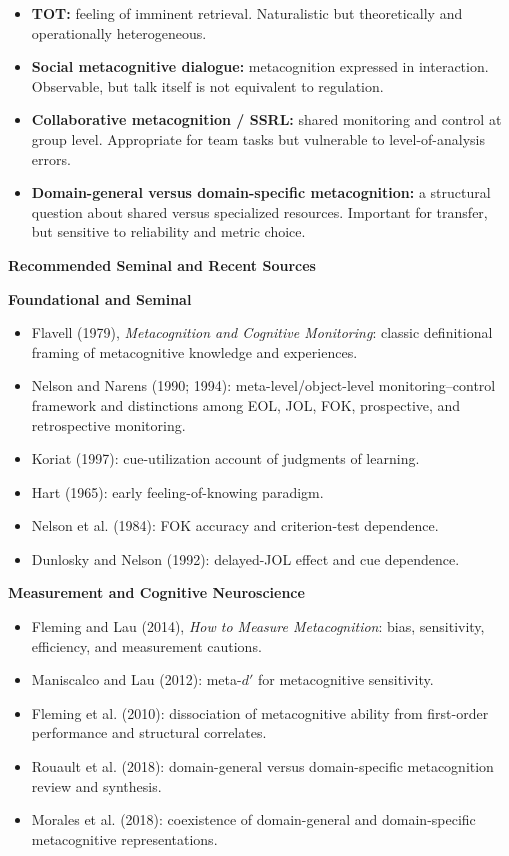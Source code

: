 \documentclass{book}
\providecommand{\ProjectDeepHeading}[2]{%
    \par\medskip\noindent\textbf{#2}\par\smallskip
}
\begin{document}
\begin{itemize}
      \item \textbf{TOT:} feeling of imminent retrieval. Naturalistic but theoretically and operationally heterogeneous.
      \item \textbf{Social metacognitive dialogue:} metacognition expressed in interaction. Observable, but talk itself is not equivalent to regulation.
      \item \textbf{Collaborative metacognition / SSRL:} shared monitoring and control at group level. Appropriate for team tasks but vulnerable to level-of-analysis errors.
      \item \textbf{Domain-general versus domain-specific metacognition:} a structural question about shared versus specialized resources. Important for transfer, but sensitive to reliability and metric choice.
   \end{itemize}

   \ProjectDeepHeading{5}{Recommended Seminal and Recent Sources}

   \ProjectDeepHeading{6}{Foundational and Seminal}

   \begin{itemize}
      \item Flavell (1979), \emph{Metacognition and Cognitive Monitoring}: classic definitional framing of metacognitive knowledge and experiences.
      \item Nelson and Narens (1990; 1994): meta-level/object-level monitoring--control framework and distinctions among EOL, JOL, FOK, prospective, and retrospective monitoring.
      \item Koriat (1997): cue-utilization account of judgments of learning.
      \item Hart (1965): early feeling-of-knowing paradigm.
      \item Nelson et al. (1984): FOK accuracy and criterion-test dependence.
      \item Dunlosky and Nelson (1992): delayed-JOL effect and cue dependence.
   \end{itemize}

   \ProjectDeepHeading{6}{Measurement and Cognitive Neuroscience}

   \begin{itemize}
      \item Fleming and Lau (2014), \emph{How to Measure Metacognition}: bias, sensitivity, efficiency, and measurement cautions.
      \item Maniscalco and Lau (2012): meta-$d'$ for metacognitive sensitivity.
      \item Fleming et al. (2010): dissociation of metacognitive ability from first-order performance and structural correlates.
      \item Rouault et al. (2018): domain-general versus domain-specific metacognition review and synthesis.
      \item Morales et al. (2018): coexistence of domain-general and domain-specific metacognitive representations.
   \end{itemize}
\end{document}
